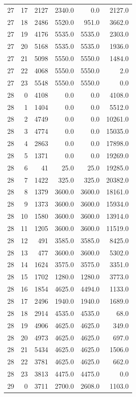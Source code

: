 \begin{longtable}{rrrrrr}
27 & 17 & 2127 & 2340.0 & 0.0 & 2127.0\\
27 & 18 & 2486 & 5520.0 & 951.0 & 3662.0\\
27 & 19 & 4176 & 5535.0 & 5535.0 & 2303.0\\
27 & 20 & 5168 & 5535.0 & 5535.0 & 1936.0\\
27 & 21 & 5098 & 5550.0 & 5550.0 & 1484.0\\
27 & 22 & 4068 & 5550.0 & 5550.0 & 2.0\\
27 & 23 & 5548 & 5550.0 & 5550.0 & 0.0\\
28 & 0 & 4108 & 0.0 & 0.0 & 4108.0\\
28 & 1 & 1404 & 0.0 & 0.0 & 5512.0\\
28 & 2 & 4749 & 0.0 & 0.0 & 10261.0\\
28 & 3 & 4774 & 0.0 & 0.0 & 15035.0\\
28 & 4 & 2863 & 0.0 & 0.0 & 17898.0\\
28 & 5 & 1371 & 0.0 & 0.0 & 19269.0\\
28 & 6 & 41 & 25.0 & 25.0 & 19285.0\\
28 & 7 & 1422 & 325.0 & 325.0 & 20382.0\\
28 & 8 & 1379 & 3600.0 & 3600.0 & 18161.0\\
28 & 9 & 1373 & 3600.0 & 3600.0 & 15934.0\\
28 & 10 & 1580 & 3600.0 & 3600.0 & 13914.0\\
28 & 11 & 1205 & 3600.0 & 3600.0 & 11519.0\\
28 & 12 & 491 & 3585.0 & 3585.0 & 8425.0\\
28 & 13 & 477 & 3600.0 & 3600.0 & 5302.0\\
28 & 14 & 1624 & 3575.0 & 3575.0 & 3351.0\\
28 & 15 & 1702 & 1280.0 & 1280.0 & 3773.0\\
28 & 16 & 1854 & 4625.0 & 4494.0 & 1133.0\\
28 & 17 & 2496 & 1940.0 & 1940.0 & 1689.0\\
28 & 18 & 2914 & 4535.0 & 4535.0 & 68.0\\
28 & 19 & 4906 & 4625.0 & 4625.0 & 349.0\\
28 & 20 & 4973 & 4625.0 & 4625.0 & 697.0\\
28 & 21 & 5434 & 4625.0 & 4625.0 & 1506.0\\
28 & 22 & 3781 & 4625.0 & 4625.0 & 662.0\\
28 & 23 & 3813 & 4475.0 & 4475.0 & 0.0\\
29 & 0 & 3711 & 2700.0 & 2608.0 & 1103.0\\

\end{longtable}
